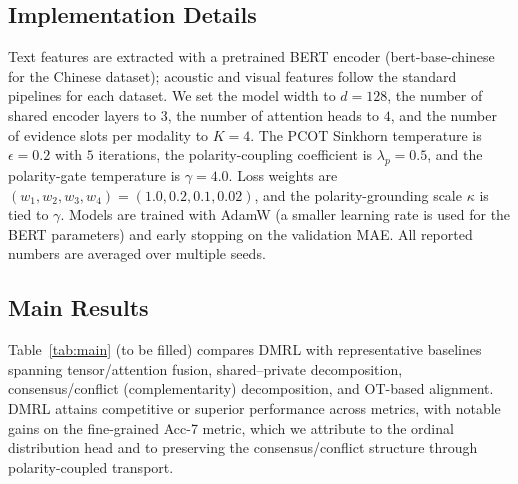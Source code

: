 \documentclass[conference]{IEEEtran}
\begin{document}
\subsection{Implementation Details}
Text features are extracted with a pretrained BERT encoder (bert-base-chinese for
the Chinese dataset); acoustic and visual features follow the standard pipelines for
each dataset. We set the model width to $d{=}128$, the number of shared encoder
layers to $3$, the number of attention heads to $4$, and the number of evidence
slots per modality to $K{=}4$. The PCOT Sinkhorn temperature is $\epsilon{=}0.2$
with $5$ iterations, the polarity-coupling coefficient is $\lambda_p{=}0.5$, and the
polarity-gate temperature is $\gamma{=}4.0$. Loss weights are
$(w_1,w_2,w_3,w_4)=(1.0,0.2,0.1,0.02)$, and the polarity-grounding scale $\kappa$ is
tied to $\gamma$. Models are trained with AdamW (a smaller learning rate is used for
the BERT parameters) and early stopping on the validation MAE. All reported numbers
are averaged over multiple seeds.

\subsection{Main Results}
Table~\ref{tab:main} (to be filled) compares DMRL with representative baselines
spanning tensor/attention fusion, shared--private decomposition, consensus/conflict
(complementarity) decomposition, and OT-based alignment. DMRL attains competitive or
superior performance across metrics, with notable gains on the fine-grained Acc-7
metric, which we attribute to the ordinal distribution head and to preserving the
consensus/conflict structure through polarity-coupled transport.

\begin{table}[t]
\centering
\caption{Comparison on CMU-MOSI and CMU-MOSEI. Best results in \textbf{bold}.
Placeholder values to be replaced with experimental results.}
\label{tab:main}
\end{table}
\end{document}
